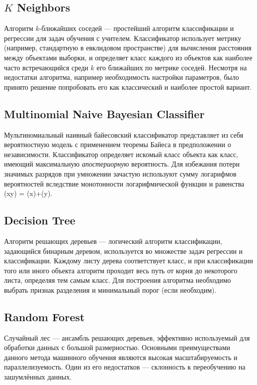 \documentclass[14pt]{matmex-diploma-custom}
\begin{document}
\subsection*{$K$ Neighbors}

Алгоритм $k$-ближайших соседей --- простейший алгоритм классификации и регрессии для задач обучения с учителем. Классификатор использует метрику (например, стандартную в евклидовом пространстве) для вычисления расстояния между объектами выборки, и определяет класс каждого из объектов как наиболее часто встречающийся среди $k$ его ближайших по метрике соседей. Несмотря на недостатки алгоритма, например необходимость настройки параметров, было принято решение попробовать его как классический и наиболее простой вариант.

\subsection*{Multinomial Naive Bayesian Classifier}
Мультиномиальный наивный байесовский классификатор представляет из себя вероятностную модель с применением теоремы Байеса в предположении о независимости. Классификатор определяет искомый класс объекта как класс, имеющий максимальную \textit{апостериорную} вероятность. Для избежания потери значимых разрядов при умножении зачастую используют сумму логарифмов вероятностей вследствие монотонности логарифмической функции и равенства \log(x\cdot y) = \log(x)+\log(y).

\subsection*{Decision Tree}
Алгоритм решающих деревьев --- логический алгоритм классификации, задающийся бинарным деревом, используется во множестве задач регрессии и классификации. Каждому листу дерева соответствует класс, и при классификации того или иного объекта алгоритм проходит весь путь от корня до некоторого листа, определяя тем самым класс. Для построения алгоритма необходимо выбрать признак разделения и минимальный порог (если необходим). 

\subsection*{Random Forest}
Случайный лес --- ансамбль решающих деревьев, эффективно используемый для обработки данных с большой размерностью. Основными преимуществами данного метода машинного обучения являются высокая масштабируемость и параллелизуемость. Один из его недостатков --- склонность к переобучению на зашумлённых данных.
\end{document}

